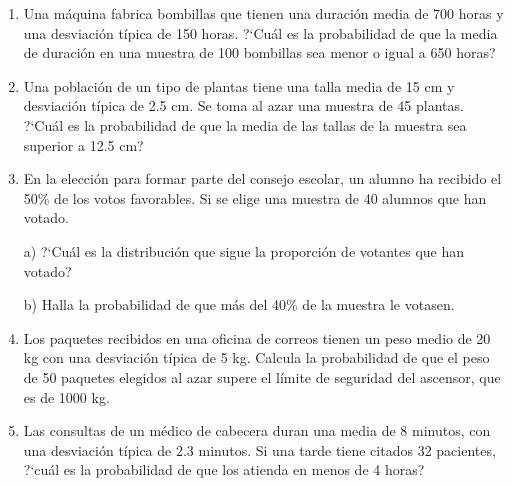 \begin{adjustwidth}{20pt}{10pt}
\begin{enumerate}[PB. 1. ]
		\hspace{-1cm}\vspace{1cm}
		
	\item 	Una máquina fabrica bombillas que tienen una duración media de 700 horas y una desviación típica de 150 horas. ?`Cuál es la probabilidad de que la media de duración en una muestra de 100 bombillas sea menor o igual a 650 horas?
 
		
		\hspace{-1cm}\vspace{1cm}
		
	\item 	Una población de un tipo de plantas tiene una talla media de 15 cm y desviación típica de 2.5 cm. Se toma al azar una muestra de 45 plantas. ?`Cuál es la probabilidad de que la media de las tallas de la muestra sea superior a 12.5 cm?
		
		\hspace{-1cm}\vspace{1cm}
		
	\item 	En la elección para formar parte del consejo escolar, un alumno ha recibido el 50\% de los votos favorables. Si se elige una muestra de 40 alumnos que han votado.
	
a) ?`Cuál es la distribución que sigue la proporción de votantes que han votado?

b) Halla la probabilidad de que más del 40\% de la muestra le votasen.

		
		\hspace{-1cm}\vspace{1cm}
		
	\item 	Los paquetes recibidos en una oficina de correos tienen un peso medio de 20 kg con una desviación típica de 5 kg. Calcula la probabilidad de que el peso de 50 paquetes elegidos al azar supere el límite de seguridad del ascensor, que es de 1000 kg. 
		
		\hspace{-1cm}\vspace{1cm}
		
	\item 	Las consultas de un médico de cabecera duran una media de 8 minutos, con una desviación típica de 2.3 minutos. Si una tarde tiene citados 32 pacientes, ?`cuál es la probabilidad de que los atienda en menos de 4 horas?
		

\end{enumerate}
\end{adjustwidth}
